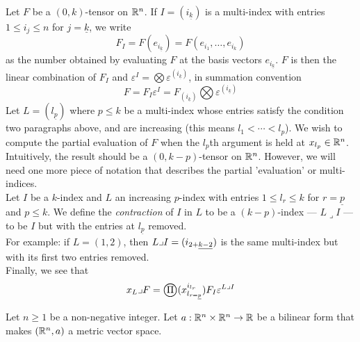 \documentclass[../main-v2-manifolds.tex]{subfiles}
\begin{document}
\begin{example}
    Let $F$ be a $(0,k)$-tensor on ${\mathbb{R}^n}$. If $I=(i_{\underline{k}})$ is a multi-index with entries $1\leq i_j\leq n$ for $j = \underline{k}$, we write 
    \[
        F_I = F(e_{i_{\underline{k}}}) = F(e_{i_1},\ldots, e_{i_k})
    \]
    as the number obtained by evaluating $F$ at the basis vectors $e_{i_{\underline{k}}}$. $F$ is then the linear combination of $F_I$ and $\varepsilon^I = \bigotimes\varepsilon^{(i_{\underline{k}})}$, in summation convention
    \[
        F = F_I\varepsilon^I = F_{(i_{\underline{k}})}\bigotimes \varepsilon^{(i_{\underline{k}})}
    \]
    Let $L = (l_{\underline{p}})$ where $p\leq k$ be a multi-index whose entries satisfy the condition two paragraphs above, and are increasing (this means $l_1<\cdots<l_p$). We wish to compute the partial evaluation of $F$ when the $l_p$th argument is held at $x_{l_p}\in{\mathbb{R}^n}$. Intuitively, the result should be a $(0,k-p)$-tensor on ${\mathbb{R}^n}$. However, we will need one more piece of notation that describes the partial 'evaluation' or multi-indices.\\

    Let $I$ be a $k$-index and $L$ an increasing $p$-index with entries $1\leq l_r\leq k$ for $r=\underline{p}$ and $p\leq k$. We define the \emph{contraction} of $I$ in $L$ to be a $(k-p)$-index --- $L\lrcorner I$ --- to be $I$ but with the entries at $l_{\underline{p}}$ removed. \\
    
    For example: if $L = (1,2)$, then $L\lrcorner I = (\UL{i}[2+][k-2])$ is the same multi-index but with its first two entries removed.\\

    Finally, we see that
    \[
        x_L\lrcorner F = \bigoprod(x_{l_{r=\underline{p}}}^{i_{l_r}})F_{I} \varepsilon^{L\lrcorner I}
    \]
\end{example}

Let $n\geq 1$ be a non-negative integer. Let $a:{\mathbb{R}^n}\times{\mathbb{R}^n}\to\mathbb{R}$ be a bilinear form that makes $({\mathbb{R}^n},a)$ a metric vector space. \\
\end{document}
